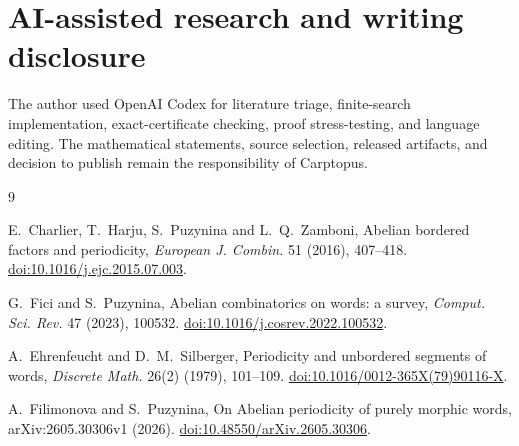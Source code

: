 \documentclass[11pt]{article}
\begin{document}
\section*{AI-assisted research and writing disclosure}

The author used OpenAI Codex for literature triage, finite-search
implementation, exact-certificate checking, proof stress-testing, and
language editing. The mathematical statements, source selection, released
artifacts, and decision to publish remain the responsibility of Carptopus.

\begin{thebibliography}{9}

E.~Charlier, T.~Harju, S.~Puzynina and L.~Q.~Zamboni,
\newblock Abelian bordered factors and periodicity,
\newblock \emph{European J. Combin.} 51 (2016), 407--418.
\newblock \href{https://doi.org/10.1016/j.ejc.2015.07.003}{doi:10.1016/j.ejc.2015.07.003}.

G.~Fici and S.~Puzynina,
\newblock Abelian combinatorics on words: a survey,
\newblock \emph{Comput. Sci. Rev.} 47 (2023), 100532.
\newblock \href{https://doi.org/10.1016/j.cosrev.2022.100532}{doi:10.1016/j.cosrev.2022.100532}.

A.~Ehrenfeucht and D.~M.~Silberger,
\newblock Periodicity and unbordered segments of words,
\newblock \emph{Discrete Math.} 26(2) (1979), 101--109.
\newblock \href{https://doi.org/10.1016/0012-365X(79)90116-X}{doi:10.1016/0012-365X(79)90116-X}.

A.~Filimonova and S.~Puzynina,
\newblock On Abelian periodicity of purely morphic words,
\newblock arXiv:2605.30306v1 (2026).
\newblock \href{https://doi.org/10.48550/arXiv.2605.30306}{doi:10.48550/arXiv.2605.30306}.

\end{thebibliography}
\end{document}
